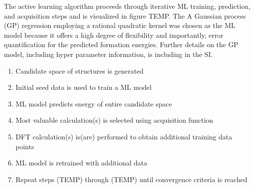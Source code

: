 The active learning algorithm proceeds through iterative ML training, prediction, and acquisition steps and is visualized in figure TEMP.
The
A Gaussian process (GP) regression employing a rational quadratic kernel was chosen as the ML model because it offers a high degree of flexibility and importantly, error quantification for the predicted formation energies.
%
Further details on the GP model, including hyper parameter information, is including in the SI.
%
%
%
%


\begin{enumerate}
  \item Candidate space of structures is generated
  \item Initial seed data is used to train a ML model
  \item ML model predicts energy of entire candidate space
  \item Most valuable calculation(s) is selected using acquisition function
  \item DFT calculation(s) is(are) performed to obtain additional training data points
  \item ML model is retrained with additional data
  \item Repeat steps (TEMP) through (TEMP) until convergence criteria is reached
\end{enumerate}




